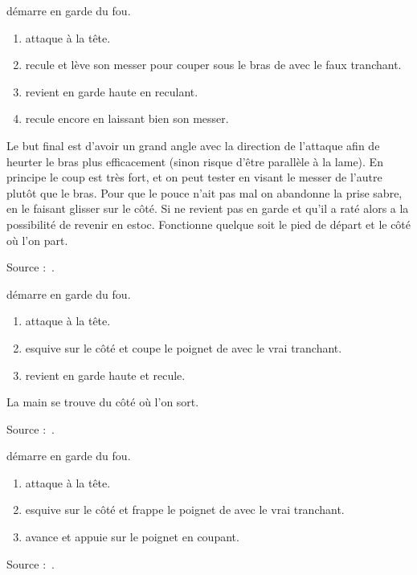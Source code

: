 \begin{technique}

\D démarre en garde du fou.

\begin{enumerate}
	\item \A attaque à la tête.
	\item \D recule et lève son messer pour couper sous le bras de \A avec le faux tranchant.
	\item \D revient en garde haute en reculant.
	\item \D recule encore en laissant bien son messer.
\end{enumerate}

Le but final est d'avoir un grand angle avec la direction de l'attaque afin de heurter le bras plus efficacement (sinon risque d'être parallèle à la lame).
En principe le coup est très fort, et on peut tester en visant le messer de l'autre plutôt que le bras. Pour que le pouce n'ait pas mal on abandonne la prise sabre, en le faisant glisser sur le côté.
Si \D ne revient pas en garde et qu'il a raté alors \A a la possibilité de revenir en estoc.
Fonctionne quelque soit le pied de départ et le côté où l'on part.

Source :~\cite{enzi:dijon:messer_inner:2015}.

\end{technique}


\begin{technique}

\D démarre en garde du fou.

\begin{enumerate}
	\item \A attaque à la tête.
	\item \D esquive sur le côté et coupe le poignet de \A avec le vrai tranchant.
	\item \D revient en garde haute et recule.
\end{enumerate}

La main se trouve du côté où l'on sort.

Source :~\cite{enzi:dijon:messer_inner:2015}.

\end{technique}


\begin{technique}

\D démarre en garde du fou.

\begin{enumerate}
	\item \A attaque à la tête.
	\item \D esquive sur le côté et frappe le poignet de \A avec le vrai tranchant.
	\item \D avance et appuie sur le poignet en coupant.
\end{enumerate}

Source :~\cite{enzi:dijon:messer_inner:2015}.

\end{technique}



